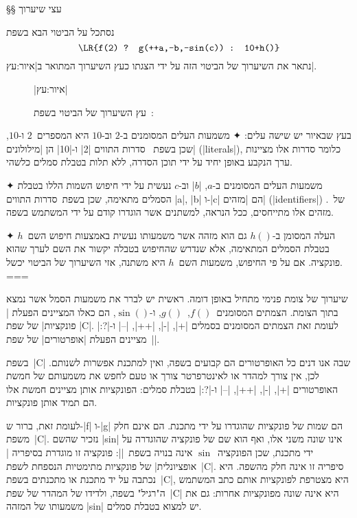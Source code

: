 §§ עצי שיערוך

נסתכל על הביטוי הבא בשפת~\CPL
 \begin{equation}
   \label{eq:infix}
   \texttt{\LR{f(2) ? g(++a,--b,-sin(c)) : 10+h()}}
\end{equation}
 נתאר את השיערוך של הביטוי הזה על ידי הצגתו כעץ השיערוך המתואר ב|איור:עץ|.

\begin{figure}[H]
  \caption[עץ שיערוך של ביטוי בשפת~]
{עץ השיערוך של הביטוי בשפת~: }
  |איור:עץ|
  \centering
  
 \end{figure}

בעץ שבאיור יש שישה עלים:
✦ משמעות העלים המסומנים ב-$2$ וב-$10$ היא המספרים~$2$ ו-$10$, שכן בשפת~\CPL
סדרות התווים \T|2| ו-\T|10| הן \ע|מילולונים| (\E|literals|), כלומר סדרות אלו
מציינות ערך הנקבע באופן יחיד על ידי תוכן הסדרה, ללא תלות בטבלת סמלים כלשהי.

✦ משמעות העלים המסומנים ב-$a$, \E|$b$| וב-$c$ נעשית על ידי חיפוש השמות הללו
בטבלת הסמלים מתאימה, שכן בשפת~\CPL סדרות התווים \T|a|, \T|b| ו-\T|c| הם
\ע|מזהים| (\E|identifiers|) של~\CPL. מזהים אלו מתייחסים, ככל הנראה, למשתנים אשר
הוגדרו קודם על ידי המשתמש בשפה.

✦ העלה המסומן ב-$h()$ גם הוא מזהה אשר משמעותו נעשית באמצעות חיפוש השם~$h$ בטבלת
הסמלים המתאימה, אלא שנדרש שהחיפוש בטבלה יקשור את השם לערך שהוא פונקציה.
אם על פי החיפוש, משמעות השם~$h$ היא משתנה, אזי השיערוך של הביטוי יכשל.
===

שיערוך של צומת פנימי מתחיל באופן דומה. ראשית יש לברר את משמעות הסמל אשר
נמצא בתוך הצומת. הצמתים המסומנים~$f()$,~$g()$, ו-$\sin()$, הם כאלו המציינים הפעלת
\ע|פונקציות| של שפת \E|C|. לעומת זאת הצמתים המסומנים בסמלים \T|+|, \T|-|,
\T|++|, \T|--| ו-\T|?:| מציינים הפעלת \ע|אופרטורים| של שפת~\E|\CPL|.

בשפת~\E|C| שבה אנו דנים כל האופרטורים הם קבועים בשפה, ואין למתכנת אפשרות
לשנותם. לכן, אין צורך למהדר או לאינטרפרטר צורך או טעם לחפש את משמעותם של חמשת
האופרטורים \T|+|, \T|-|, \T|++|, \T|--| ו-\T|?:| בטבלת סמלים: הפונקציות אותן
מציינים חמשת אלו הם תמיד אותן פונקציות.

לעומת זאת, ברור ש-\T|f| ו-\T|g| הם שמות של פונקציות שהוגדרו על ידי מתכנת. הם
אינם חלק משפת~\E|C|. נזכיר שהשם \T|sin| אינו שונה משני אלו, ואף הוא
שם של פונקציה שהוגדרה על ידי מתכנת, שכן הפונקציה~$\sin$ אינה בנויה
בשפת~\E|\CPL|: פונקציה זו מוגדרת בסיפריה \ע|אופציונלית| של פונקציות מתימטיות
הנספחת לשפת~\E|C|. סיפריה זו אינה חלק מהשפה. היא נכתבה על יד מתכנת או מתכנתים
בשפת~\E|C|, היא מצטרפת לפונקציות אותם כתב המשתמש ה"רגיל" בשפה, ולדידו של המהדר
של שפת~\E|C| היא אינה שונה מפונקציות אחרות: גם את משמעותו של המזהה \T|sin| יש
למצוא בטבלת סמלים.

